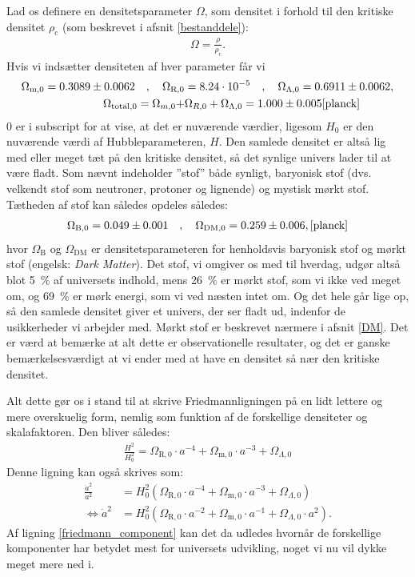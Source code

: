 Lad os definere en densitetsparameter $\Omega$, som densitet i forhold til den kritiske densitet $\rho_\text{c}$ (som beskrevet i afsnit \ref{bestanddele}):
\begin{align}
\Omega=\frac{\rho}{\rho_\text{c}}.
\end{align}
Hvis vi indsætter densiteten af hver parameter får vi
\begin{align}
\Omega_{\text{m},0}=0.3089\pm 0.0062 \quad , \quad
\Omega_{\text{R},0}&=8.24\cdot 10^{-5} \quad , \quad
\Omega_{\Lambda,0}=0.6911\pm 0.0062, \\
\Omega_{\text{total},0}=\Omega_{m,0} + &\Omega_{R,0} + \Omega_{\Lambda,0}=1.000\pm0.005 \label{Omegatot} \cite{planck}
\end{align}
%
0 er i subscript for at vise, at det er nuværende værdier, ligesom $H_0$ er den nuværende værdi af Hubbleparameteren, $H$. Den samlede densitet er altså lig med eller meget tæt på den kritiske densitet, så det synlige univers lader til at være fladt. Som nævnt indeholder ''stof''  både synligt, baryonisk stof (dvs. velkendt stof som neutroner, protoner og lignende) og mystisk mørkt stof. Tætheden af stof kan således opdeles således:
\begin{align}
\Omega_{\text{B},0}=0.049\pm 0.001 \quad , \quad
\Omega_{\text{DM},0}=0.259\pm 0.006, \cite{planck}
\end{align}
hvor $\Omega_\text{B}$ og $\Omega_\text{DM}$ er densitetsparameteren for henholdsvis baryonisk stof og mørkt stof (engelsk: \textit{Dark Matter}). Det stof, vi omgiver os med til hverdag, udgør altså blot \SI{5}{\%} af universets indhold, mens \SI{26}{\%} er mørkt stof, som vi ikke ved meget om, og \SI{69}{\%} er mørk energi, som vi ved næsten intet om. Og det hele går lige op, så den samlede densitet giver et univers, der ser fladt ud, indenfor de usikkerheder vi arbejder med. Mørkt stof er beskrevet nærmere i afsnit \ref{DM}. Det er værd at bemærke at alt dette er observationelle resultater, og det er ganske bemærkelsesværdigt at vi ender med at have en densitet så nær den kritiske densitet.

Alt dette gør os i stand til at skrive Friedmannligningen på en lidt lettere og mere overskuelig form, nemlig som funktion af de forskellige densiteter og skalafaktoren. Den bliver således:
\begin{align}
\frac{H^2}{H_0^2}=\Omega_{\text{R},0}\cdot a^{-4} + \Omega_{\text{m},0}\cdot a^{-3} + \Omega_{\Lambda,0} \label{friedmann_component}
\end{align}
Denne ligning kan også skrives som:
\begin{align}
    \frac{\dot{a}^2}{a^2} &= H_0^2\left(\Omega_{\text{R},0}\cdot a^{-4} + \Omega_{\text{m},0}\cdot a^{-3} + \Omega_{\Lambda,0}\right) \\
    \Leftrightarrow \dot{a}^2 &= H_0^2 \left(\Omega_{\text{R},0}\cdot a^{-2} + \Omega_{\text{m},0}\cdot a^{-1} + \Omega_{\Lambda,0} \cdot a^2\right).
\end{align}
Af ligning \eqref{friedmann_component} kan det da udledes hvornår de forskellige komponenter har betydet mest for universets udvikling, noget vi nu vil dykke meget mere ned i.

